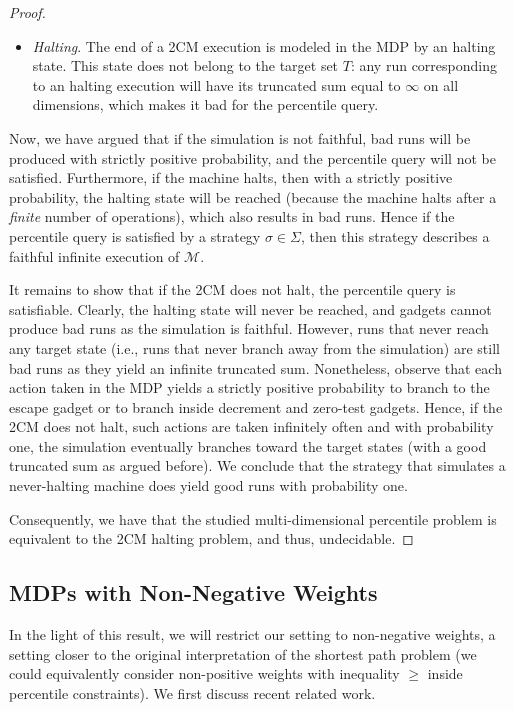 \documentclass{llncs}
\newcommand{\strat}{\ensuremath{\sigma} }
\newcommand{\truncatedTarget}{\ensuremath{T} }
\newcommand{\twoCM}{\ensuremath{\mathcal{M}} }
\newcommand{\strats}{\ensuremath{\Sigma} }
\begin{document}
\begin{proof}
\begin{itemize}
\item \textit{Halting}. The end of a 2CM execution is modeled in the MDP by an halting state. This state does not belong to the target set $\truncatedTarget$: any run corresponding to an halting execution will have its truncated sum equal to $\infty$ on all dimensions, which makes it bad for the percentile query.

\end{itemize}

Now, we have argued that if the simulation is not faithful, bad runs will be produced with strictly positive probability, and the percentile query will not be satisfied. Furthermore, if the machine halts, then with a strictly positive probability, the halting state will be reached (because the machine halts after a \textit{finite} number of operations), which also results in bad runs. Hence if the percentile query is satisfied by a strategy $\strat \in \strats$, then this strategy describes a faithful infinite execution of $\twoCM$.

It remains to show that if the 2CM does not halt, the percentile query is satisfiable. Clearly, the halting state will never be reached, and gadgets cannot produce bad runs as the simulation is faithful. However, runs that never reach any target state (i.e., runs that never branch away from the simulation) are still bad runs as they yield an infinite truncated sum. Nonetheless, observe that each action taken in the MDP yields a strictly positive probability to branch to the escape gadget or to branch inside decrement and zero-test gadgets. Hence, if the 2CM does not halt, such actions are taken infinitely often and with probability one, the simulation eventually branches toward the target states (with a good truncated sum as argued before). We conclude that the strategy that simulates a never-halting machine does yield good runs with probability one.

Consequently, we have that the studied multi-dimensional percentile problem is equivalent to the 2CM halting problem, and thus, undecidable.
\end{proof}

\subsection{MDPs with Non-Negative Weights}

In the light of this result, we will restrict our setting to non-negative weights, a setting closer to the original interpretation of the shortest path problem (we could equivalently consider non-positive weights with inequality $\geq$ inside percentile constraints). We first discuss recent related work.
\end{document}
